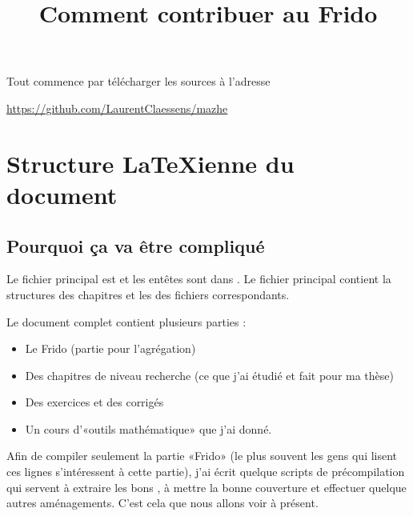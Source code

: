 




\title{Comment contribuer au Frido}
\maketitle

\tableofcontents

Tout commence par télécharger les sources à l'adresse
\begin{center}
    \url{https://github.com/LaurentClaessens/mazhe}
\end{center}

\section{Structure \LaTeX ienne du document}

\subsection{Pourquoi ça va être compliqué}

Le fichier principal est  et les entêtes sont dans . Le fichier principal contient la structures des chapitres et les  des fichiers correspondants.

Le document complet contient plusieurs parties :
\begin{itemize}
    \item Le Frido (partie pour l'agrégation)
    \item Des chapitres de niveau recherche (ce que j'ai étudié et fait pour ma thèse)
    \item Des exercices et des corrigés
    \item Un cours d'«outils mathématique» que j'ai donné.
\end{itemize}
Afin de compiler seulement la partie «Frido» (le plus souvent les gens qui lisent ces lignes s'intéressent à cette partie), j'ai écrit quelque scripts de précompilation qui servent à extraire les bons , à mettre la bonne couverture et effectuer quelque autres aménagements. C'est cela que nous allons voir à présent.

